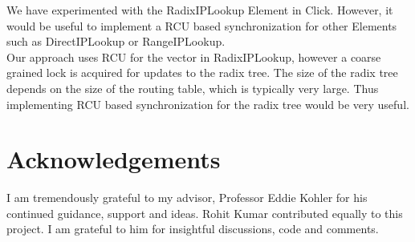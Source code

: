 \documentclass[a4paper,marginparwidth=50pt,marginparsep=10pt]{article}
\begin{document}
We have experimented with the RadixIPLookup Element in Click. However, it would be useful to implement a RCU based synchronization for other Elements such as DirectIPLookup or RangeIPLookup.\\ 

Our approach uses RCU for the vector in RadixIPLookup, however a coarse grained lock is acquired for updates to the radix tree. The size of the radix tree depends on the size of the routing table, which is typically very large. Thus implementing RCU based synchronization for the radix tree would be very useful.
\section{Acknowledgements}
I am tremendously grateful to my advisor, Professor Eddie Kohler for his continued guidance, support and ideas.
Rohit Kumar contributed equally to this project. I am grateful to him for insightful discussions, code and comments.


\end{document}
